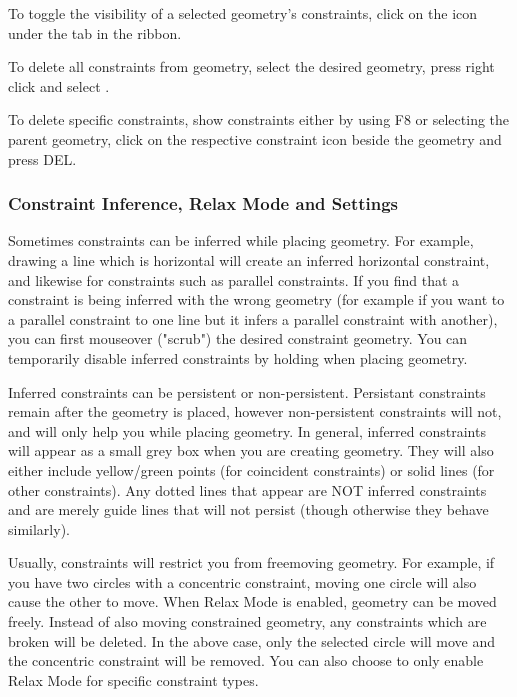 To toggle the visibility of a selected geometry's constraints, click on the  icon under the  tab in the ribbon.

To delete all constraints from geometry, select the desired geometry, press right click and select .

To delete specific constraints, show constraints either by using F8 or selecting the parent geometry, click on the respective constraint icon beside the geometry and press DEL.

\subsubsection{Constraint Inference, Relax Mode and Settings}

Sometimes constraints can be inferred while placing geometry. For example, drawing a line which is horizontal will create an inferred horizontal constraint, and likewise for constraints such as parallel constraints. If you find that a constraint is being inferred with the wrong geometry (for example if you want to a parallel constraint to one line but it infers a parallel constraint with another), you can first mouseover ("scrub") the desired constraint geometry. You can temporarily disable inferred constraints by holding  when placing geometry.

Inferred constraints can be persistent or non-persistent. Persistant constraints remain after the geometry is placed, however non-persistent constraints will not, and will only help you while placing geometry. In general, inferred constraints will appear as a small grey box when you are creating geometry. They will also either include yellow/green points (for coincident constraints) or solid lines (for other constraints). Any dotted lines that appear are NOT inferred constraints and are merely guide lines that will not persist (though otherwise they behave similarly).

Usually, constraints will restrict you from freemoving geometry. For example, if you have two circles with a concentric constraint, moving one circle will also cause the other to move. When Relax Mode is enabled, geometry can be moved freely. Instead of also moving constrained geometry, any constraints which are broken will be deleted. In the above case, only the selected circle will move and the concentric constraint will be removed. You can also choose to only enable Relax Mode for specific constraint types.

